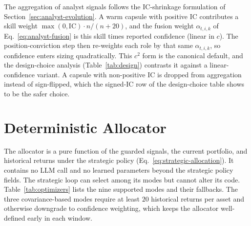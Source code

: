 \documentclass[letterpaper]{article}
\begin{document}
The aggregation of analyst signals follows the IC-shrinkage formulation of
Section~\ref{sec:analyst-evolution}. A warm capsule with positive IC contributes a
skill weight $\max(0,\mathrm{IC})\cdot n/(n{+}20)$, and the fusion weight
$\alpha_{t,i,k}$ of Eq.~\ref{eq:analyst-fusion} is this skill times reported
confidence (linear in $c$). The position-conviction step then re-weights each role
by that same $\alpha_{t,i,k}$, so confidence enters sizing quadratically. This
$c^2$ form is the canonical default, and the design-choice analysis
(Table~\ref{tab:design}) contrasts it against a linear-confidence variant. A capsule
with non-positive IC is dropped from aggregation instead of sign-flipped, which the
signed-IC row of the design-choice table shows to be the safer choice.

\section{Deterministic Allocator}
\label{app:allocator}

The allocator is a pure function of the guarded signals, the current portfolio, and
historical returns under the strategic policy (Eq.~\ref{eq:strategic-allocation}).
It contains no LLM call and no learned parameters beyond the strategic policy
fields. The strategic loop can select among its modes but cannot alter its code.
Table~\ref{tab:optimizers} lists the nine supported modes and their fallbacks. The
three covariance-based modes require at least $20$ historical returns per asset and
otherwise downgrade to confidence weighting, which keeps the allocator well-defined
early in each window.
\end{document}
